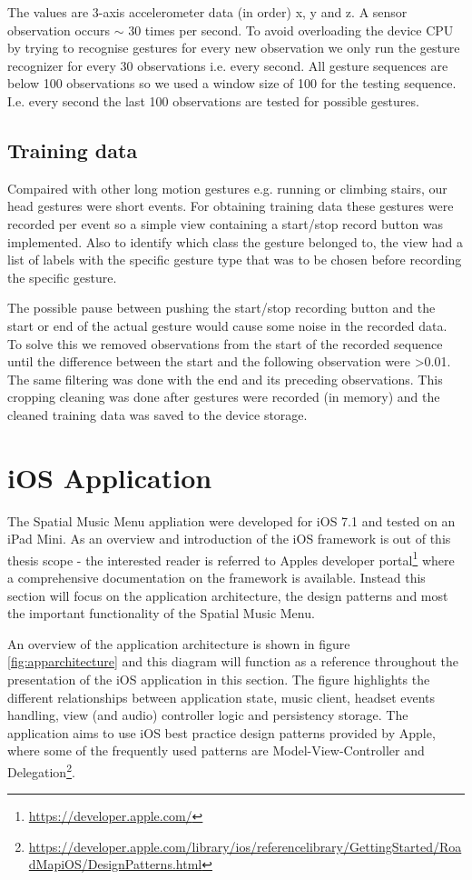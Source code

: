 The values are 3-axis accelerometer data (in order) x, y and z. A sensor observation occurs $\sim$ 30 times per second. To avoid overloading the device CPU by trying to recognise gestures for every new observation we only run the gesture recognizer for every 30 observations i.e. every second. All gesture sequences are below 100 observations so we used a window size of 100 for the testing sequence. I.e. every second the last 100 observations are tested for possible gestures.

\subsection{Training data}
Compaired with other long motion gestures e.g. running or climbing stairs, our head gestures were short events. For obtaining training data these gestures were recorded per event so a simple view containing a start/stop record button was implemented. Also to identify which class the gesture belonged to, the view had a list of labels with the specific gesture type that was to be chosen before recording the specific gesture.

The possible pause between pushing the start/stop recording button and the start or end of the actual gesture would cause some noise in the recorded data. To solve this we removed observations from the start of the recorded sequence until the difference between the start and the following observation were \textgreater 0.01. The same filtering was done with the end and its preceding observations. This cropping cleaning was done after gestures were recorded (in memory) and the cleaned training data was saved to the device storage.


\section{iOS Application}
The Spatial Music Menu appliation were developed for iOS 7.1 and tested on an iPad Mini. As an overview and introduction of the iOS framework is out of this thesis scope - the interested reader is referred to Apples developer portal\footnote{\url{https://developer.apple.com/}} where a comprehensive documentation on the framework is available. Instead this section will focus on the application architecture, the design patterns and most the important functionality of the Spatial Music Menu.

An overview of the application architecture is shown in figure \ref{fig:apparchitecture} and this diagram will function as a reference throughout the presentation of the iOS application in this section. The figure highlights the different relationships between application state, music client, headset events handling, view (and audio) controller logic and persistency storage. The application aims to use iOS best practice design patterns provided by Apple, where some of the frequently used patterns are Model-View-Controller and Delegation\footnote{\url{https://developer.apple.com/library/ios/referencelibrary/GettingStarted/RoadMapiOS/DesignPatterns.html}}.

